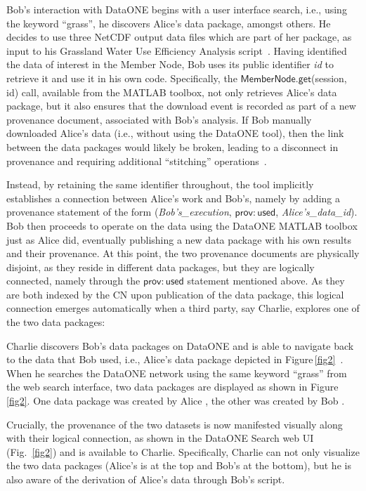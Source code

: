 \documentclass[a4paper]{llncs}
\newcommand{\code}[1]{\ensuremath{\mathsf{#1}}}
\newcommand{\Figref}[1]{Figure\,\ref{#1}}
\begin{document}
Bob's interaction with DataONE begins with a user interface search, i.e., using the keyword ``grass'', he discovers Alice's data package, amongst others.  He decides to use three NetCDF output data files which are part of her package, as input to his Grassland Water Use Efficiency Analysis script~\cite{MsTMIP-model-output-data-set}.  Having identified the data of interest in the Member Node, Bob uses its public identifier \textit{id} to retrieve it and use it in his own code. %
Specifically, the \code{MemberNode.get}(session, id) call, available from the MATLAB toolbox, not only retrieves Alice's data package, but it also ensures that the download event is recorded as part of a new provenance document, associated with Bob's analysis.
%
If Bob manually downloaded Alice's data (i.e., without using the DataONE tool), then the link between the data packages would likely be broken, leading to a disconnect in provenance and requiring additional ``stitching'' operations~\cite{missing-link}.


Instead, by retaining the same identifier throughout, the tool implicitly establishes a connection between Alice's work and Bob's, namely by adding a provenance statement of the form (\emph{{Bob's\_execution}}, \code{prov{:}used}, {\emph{Alice's\_data\_id}}). Bob then proceeds to operate on the data using the DataONE MATLAB toolbox just as Alice did, eventually publishing a new data package with his own results and their provenance.  At this point, the two provenance documents are physically disjoint, as they reside in different data packages, but they are logically connected, namely through the \code{prov{:}used} statement mentioned above.  As they are both indexed by the CN upon publication of the data package, this logical connection emerges automatically when a third party, say Charlie, explores one of the two data packages:

Charlie discovers Bob's data packages on DataONE and is able to navigate back to the data that Bob used, i.e., Alice's data package depicted in \Figref{fig2}~\cite{Katz,data-trajectories}. When he searches the DataONE network using the same keyword ``grass'' from the web search interface, two data packages are displayed as shown in \Figref{fig2}. One data package was created by Alice \cite{yaxing}, the other was created by Bob \cite{christopher}.

Crucially, the provenance of the two datasets is now manifested visually along with their logical connection, as shown in the DataONE Search web UI \cite{dataone-demo} (Fig.~\ref{fig2}) and is available to Charlie. Specifically, Charlie can not only visualize the two data packages (Alice's is at the top and Bob's at the bottom), but he is also aware of the derivation of Alice's data through Bob's script.
\end{document}
